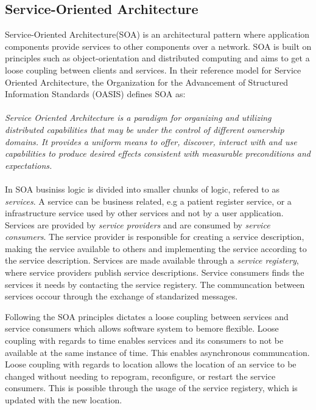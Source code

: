 \documentclass[USenglish]{article}
\begin{document}
\subsection{Service-Oriented Architecture}
Service-Oriented Architecture(SOA) is an architectural pattern where application components provide services to other components over a network. SOA is built on principles such as object-orientation and distributed computing and aims to get a loose coupling between clients and services. In their reference model for Service Oriented Architecture\cite{oasis-soa-reference-model}, the Organization for the Advancement of Structured Information Standards (OASIS) defines SOA as: 
\paragraph{}
\textit{Service Oriented Architecture is a paradigm for organizing and utilizing distributed capabilities that may be under the control of different ownership domains. It provides a uniform means to offer, discover, interact with and use capabilities to produce desired effects consistent with measurable preconditions and expectations.}

\paragraph{}
In SOA businiss logic is divided into smaller chunks of logic, refered to as \textit{services}. A service can be business related, e.g a patient register service, or a infrastructure service used by other services and not by a user application.  Services are provided by \textit{service providers} and are consumed by \textit{service consumers}. The service provider is responsible for creating a service description, making the service available to others and implementing the service according to the service description. Services are made available through a \textit{service registery}, where service providers publish service descriptions. Service consumers finds the services it needs by contacting the service registery. The communcation between services occour through the exchange of standarized messages. 

Following the SOA principles dictates a loose coupling between services and service consumers which allows software system to bemore flexible. Loose coupling with regards to time enables services and its consumers to not be available at the same instance of time. This enables asynchronous communcation. Loose coupling with regards to location allows the location of an service to be changed without needing to repogram, reconfigure, or restart the service consumers. This is possible through the usage of the service registery, which is updated with the new location.
\end{document}
